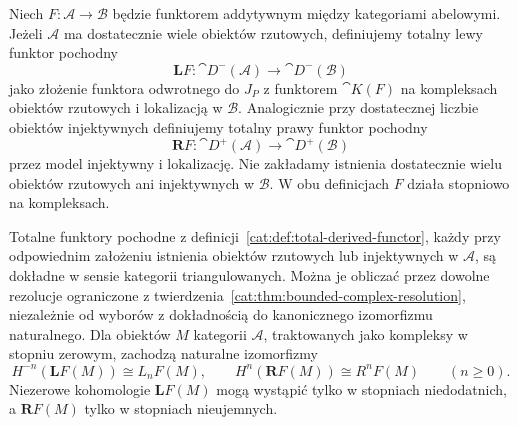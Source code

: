 \begin{definicja}\label{cat:def:total-derived-functor}
Niech $F:\mathcal A\to\mathcal B$ będzie funktorem addytywnym między kategoriami abelowymi. Jeżeli $\mathcal A$ ma dostatecznie wiele obiektów rzutowych, definiujemy totalny lewy funktor pochodny
\[
 \mathbf L F:\cat D^-(\mathcal A)\longrightarrow\cat D^-(\mathcal B)
\]
jako złożenie funktora odwrotnego do $J_P$ z funktorem $\cat K(F)$ na kompleksach obiektów rzutowych i lokalizacją w $\mathcal B$. Analogicznie przy dostatecznej liczbie obiektów injektywnych definiujemy totalny prawy funktor pochodny
\[
 \mathbf R F:\cat D^+(\mathcal A)\longrightarrow\cat D^+(\mathcal B)
\]
przez model injektywny i lokalizację. Nie zakładamy istnienia dostatecznie wielu obiektów rzutowych ani injektywnych w $\mathcal B$. W obu definicjach $F$ działa stopniowo na kompleksach.
\end{definicja}
\begin{twierdzenie}\label{cat:thm:total-derived-functor}
Totalne funktory pochodne z definicji~\ref{cat:def:total-derived-functor}, każdy przy odpowiednim założeniu istnienia obiektów rzutowych lub injektywnych w $\mathcal A$, są dokładne w sensie kategorii triangulowanych. Można je obliczać przez dowolne rezolucje ograniczone z twierdzenia~\ref{cat:thm:bounded-complex-resolution}, niezależnie od wyborów z dokładnością do kanonicznego izomorfizmu naturalnego. Dla obiektów $M$ kategorii $\mathcal A$, traktowanych jako kompleksy w stopniu zerowym, zachodzą naturalne izomorfizmy
\[
 H^{-n}(\mathbf L F(M))\cong L_nF(M),\qquad
 H^n(\mathbf R F(M))\cong R^nF(M)\qquad(n\ge0).
\]
Niezerowe kohomologie $\mathbf L F(M)$ mogą wystąpić tylko w stopniach niedodatnich, a $\mathbf R F(M)$ tylko w stopniach nieujemnych.
\end{twierdzenie}
